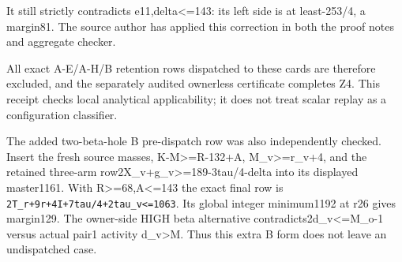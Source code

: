 \documentclass[10pt,a4paper]{article}
\theoremstyle{definition}
\begin{document}
It still strictly contradicts e11,\allowbreak{}delta\textless=\allowbreak{}143: its left side is
at least-253/4,\allowbreak{} a margin81. The source author has applied this
correction in both the proof notes and aggregate checker.

All exact A-E/A-H/B retention rows dispatched to these cards are
therefore excluded,\allowbreak{} and the separately audited ownerless certificate
completes Z4. This receipt checks local analytical applicability; it
does not treat scalar replay as a configuration classifier.

The added two-beta-hole B pre-dispatch row was also independently
checked. Insert the fresh source masses,\allowbreak{} K-M\textgreater=\allowbreak{}R-132+\allowbreak{}A,\allowbreak{}
M\_\allowbreak{}v\textgreater=\allowbreak{}r\_\allowbreak{}v+\allowbreak{}4,\allowbreak{} and the retained three-arm
row2X\_\allowbreak{}v+\allowbreak{}g\_\allowbreak{}v\textgreater=\allowbreak{}189-3tau/4-delta into its displayed
master1161. With R\textgreater=\allowbreak{}68,\allowbreak{}A\textless=\allowbreak{}143 the exact final row is
\texttt{2T\_\allowbreak{}\allowbreak{}r+\allowbreak{}9r+\allowbreak{}4I+\allowbreak{}7tau/\allowbreak{}4+\allowbreak{}2tau\_\allowbreak{}\allowbreak{}v<=\allowbreak{}1063}. Its global
integer minimum1192 at r26 gives margin129. The owner-side HIGH beta
alternative contradicts2d\_\allowbreak{}v\textless=\allowbreak{}M\_\allowbreak{}o-1 versus actual pair1
activity d\_\allowbreak{}v\textgreater M. Thus this extra B form does not leave an
undispatched case.
\end{document}
